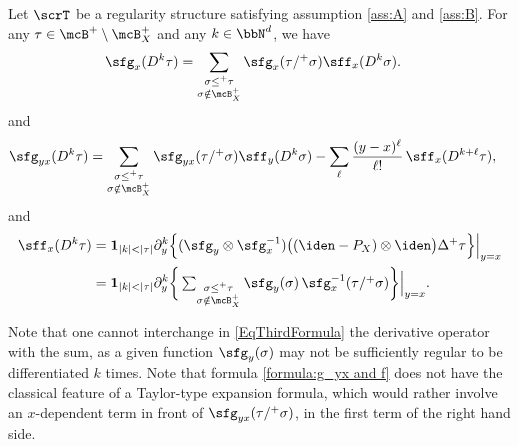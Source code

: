\begin{lem} \label{LemUsefulIdentities}
Let $\scrT$ be a regularity structure satisfying assumption \eqref{ass:A} and \eqref{ass:B}. For any $\tau\in\mcB^+\setminus\mcB_X^+$ and any $k\in\bbN^d$, we have
\begin{align} \label{formula:g_x and f_x}
\sfg_x(D^k\tau) &= \sum_{\substack{\sigma\leq^+\tau\\\sigma\notin\mcB_X^+}} \sfg_x(\tau/^+\sigma)\sff_x(D^k\sigma).
\end{align}
and
\begin{align} \label{formula:g_yx and f}
\sfg_{yx}(D^k\tau) &= \sum_{\substack{\sigma\leq^+\tau\\\sigma\notin\mcB_X^+}} \sfg_{yx}(\tau/^+\sigma)\sff_y(D^k\sigma) - \sum_{\ell}\frac{(y-x)^\ell}{\ell!}\,\sff_x(D^{k+\ell}\tau),
\end{align}
and
\begin{equation} \label{EqThirdFormula} \begin{split}
\sff_x(D^k\tau) &= {\bf1}_{|k|<|\tau|}\partial_y^k \Big\{({\sfg}_y\otimes\sfg_x^{-1}) \bigl((\iden -P_X)\otimes\iden \bigr) \Delta^+\tau\Big\}\Big|_{y=x} \\
 &= {\bf1}_{|k|<|\tau|}\partial_y^k \bigg\{
\textstyle\sum_{\substack{\sigma\leq^+\tau\\\sigma\notin\mcB_X^+}} \sfg_y(\sigma)\,\sfg_x^{-1}(\tau/^+\sigma)\bigg\}\Big|_{y=x}.
\end{split} \end{equation}
\end{lem}

Note that one cannot interchange in \eqref{EqThirdFormula} the derivative operator with the sum, as a given function ${\sfg}_y(\sigma)$ may not be sufficiently regular to be differentiated $k$ times. Note that formula \eqref{formula:g_yx and f} does not have the classical feature of a Taylor-type expansion formula, which would rather involve an $x$-dependent term in front of $\sfg_{yx}(\tau/^+\sigma)$, in the first term of the right hand side.

